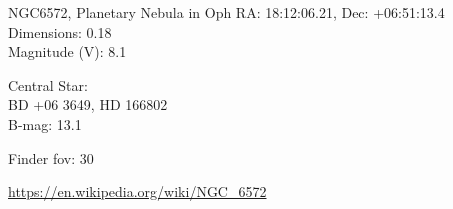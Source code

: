\begin{block}{NGC6572, Planetary Nebula in Oph}
    RA: 18:12:06.21, Dec: +06:51:13.4 \\ 
    Dimensions: 0.18 \\ 
    Magnitude (V): 8.1

    Central Star: \\ 
      \hspace{1em}BD +06 3649, HD 166802 \\ 
      \hspace{1em}B-mag: 13.1 


    Finder fov: 30 

    \url{https://en.wikipedia.org/wiki/NGC_6572} 
\end{block}